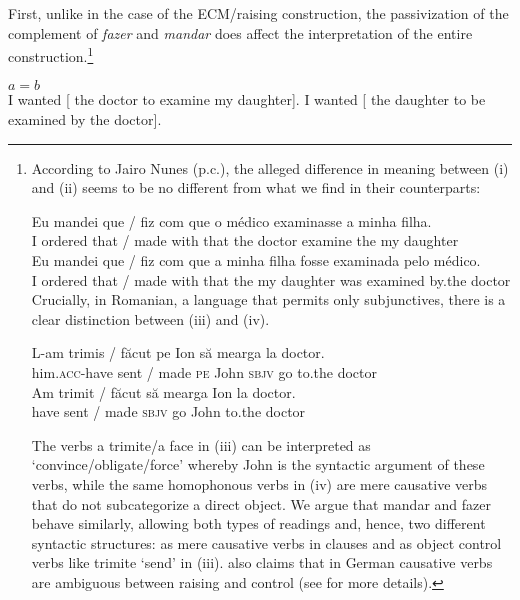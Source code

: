 \documentclass[output=paper]{langsci/langscibook}
\begin{document}
First, unlike in the case of the ECM\slash raising construction, the passivization of the complement of \textit{fazer} and \textit{mandar} does affect the interpretation of the entire construction.\footnote{According to Jairo Nunes (p.c.), the alleged difference in meaning between (i) and (ii) seems to be no different from what we find in their  counterparts: 

\ea \gll Eu mandei que / fiz      com que o    médico examinasse a    minha filha.\\
	I    ordered that / made with that         the doctor  examine      the my      daughter\\
\z
\ea
\gll Eu  mandei  que / fiz      com que a    minha filha        fosse examinada pelo     médico.\\
	I     ordered  that / made with that         the my     daughter  was   examined   by.the doctor\\
\z
Crucially, in Romanian, a language that permits only subjunctives, there is a clear distinction between (iii) and (iv). 

\ea \gll L-am              trimis / făcut     pe Ion   să     mearga la       doctor.\\
         him.\textsc{acc}-have sent / made      \textsc{pe} John \textsc{sbjv} go         to.the doctor\\
\z
\ea \gll Am trimit / făcut să     mearga Ion  la       doctor.\\
         have sent / made \textsc{sbjv} go        John to.the doctor\\
\z

The verbs a trimite\slash a face in (iii) can be interpreted as ‘convince\slash obligate\slash force’ whereby John is the syntactic  argument of these verbs, while the same homophonous verbs in (iv) are mere causative verbs that do not subcategorize a direct object. We argue that mandar and fazer behave similarly, allowing both types of readings and, hence, two different syntactic structures: as mere causative verbs in  clauses and as object control verbs like trimite ‘send’ in (iii). \citet{Wurmbrand2001} also claims that in German causative verbs are ambiguous between raising and control (see \citet{Wurmbrand2001} for more details).}

\ea%
    $a = b$ \citep[119]{Farrell1995}\label{ex:moreno:9}\\
    \ea I wanted [ the doctor to examine my daughter].
    \ex I wanted [ the daughter to be examined by the doctor].
    \z
\z
\end{document}
